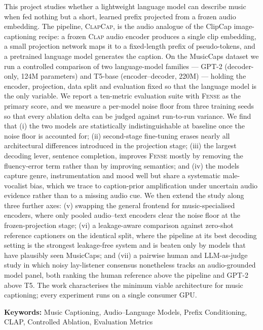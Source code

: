 \documentclass[9pt]{report}
\newcommand{\fense}{\textsc{Fense}}
\newcommand{\clapenc}{\textsc{Clap}}
\newcommand{\sys}{\textsc{ClapCap}}
\begin{document}
This project studies whether a lightweight language model can describe music when fed
nothing but a short, learned prefix projected from a frozen audio embedding. The pipeline,
\sys{}, is the audio analogue of the ClipCap image-captioning recipe: a frozen \clapenc{} audio
encoder produces a single clip embedding, a small projection network maps it to a fixed-length
prefix of pseudo-tokens, and a pretrained language model generates the caption. On the MusicCaps
dataset we run a controlled comparison of two language-model families --- GPT-2 (decoder-only,
124M parameters) and T5-base (encoder--decoder, 220M) --- holding the encoder, projection, data
split and evaluation fixed so that the language model is the only variable. We report a
ten-metric evaluation suite with \fense{} as the primary score, and we measure a per-model
noise floor from three training seeds so that every ablation delta can be judged against
run-to-run variance. We find that (i) the two models are statistically indistinguishable at
baseline once the noise floor is accounted for; (ii) second-stage fine-tuning erases nearly all
architectural differences introduced in the projection stage; (iii) the largest decoding lever,
sentence completion, improves \fense{} mostly by removing the fluency-error term rather than by
improving semantics; and (iv) the models capture genre, instrumentation and mood well but share
a systematic male-vocalist bias, which we trace to caption-prior amplification under uncertain
audio evidence rather than to a missing audio cue. We then extend the study along three further
axes: (v) swapping the general frontend for music-specialised encoders, where only pooled
audio--text encoders clear the noise floor at the frozen-projection stage; (vi) a leakage-aware
comparison against zero-shot reference captioners on the identical split, where the pipeline at
its best decoding setting is the strongest leakage-free system and is beaten only by models that
have plausibly seen MusicCaps; and (vii) a pairwise human and LLM-as-judge study in which noisy
lay-listener consensus nonetheless tracks an audio-grounded model panel, both ranking the human
reference above the pipeline and GPT-2 above T5. The work characterises the minimum viable
architecture for music captioning; every experiment runs on a single consumer GPU.

\vspace{0.5cm}

\noindent \textbf{Keywords:} Music Captioning, Audio--Language Models, Prefix Conditioning, CLAP, Controlled Ablation, Evaluation Metrics
\end{document}
